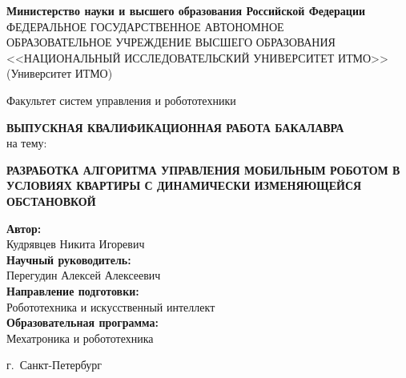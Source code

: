 
\thispagestyle{empty}

\begin{center}
    \textbf{Министерство науки и высшего образования Российской Федерации}\\[0.2em]
    ФЕДЕРАЛЬНОЕ ГОСУДАРСТВЕННОЕ АВТОНОМНОЕ\\
    ОБРАЗОВАТЕЛЬНОЕ УЧРЕЖДЕНИЕ ВЫСШЕГО ОБРАЗОВАНИЯ\\
    <<НАЦИОНАЛЬНЫЙ ИССЛЕДОВАТЕЛЬСКИЙ УНИВЕРСИТЕТ ИТМО>>\\
    (Университет ИТМО)
\end{center}

\vspace{1.5em}

\begin{center}
    Факультет систем управления и робототехники
\end{center}

\vspace{3em}

\begin{center}
    \textbf{ВЫПУСКНАЯ КВАЛИФИКАЦИОННАЯ РАБОТА БАКАЛАВРА}\\[0.5em]
    на тему:
\end{center}

\begin{center}
    \vspace{0.5em}
    \textbf{\MakeUppercase{Разработка алгоритма управления мобильным роботом в условиях квартиры с динамически изменяющейся обстановкой}}
\end{center}

\vspace{1.0em}

\vspace{\fill}

\begin{flushright}
    \textbf{Автор:}\\
    Кудрявцев Никита Игоревич\\[0.8em]
    \textbf{Научный руководитель:}\\
    Перегудин Алексей Алексеевич\\[0.8em]
    \textbf{Направление подготовки:}\\
    Робототехника и искусственный интеллект
    \mbox{}\\[0.8em]
    \textbf{Образовательная программа:}\\
    Мехатроника и робототехника
    \mbox{}
\end{flushright}

\vspace{\fill}

\begin{center}
    г.~Санкт-Петербург\\
    \the\year{}
\end{center}
